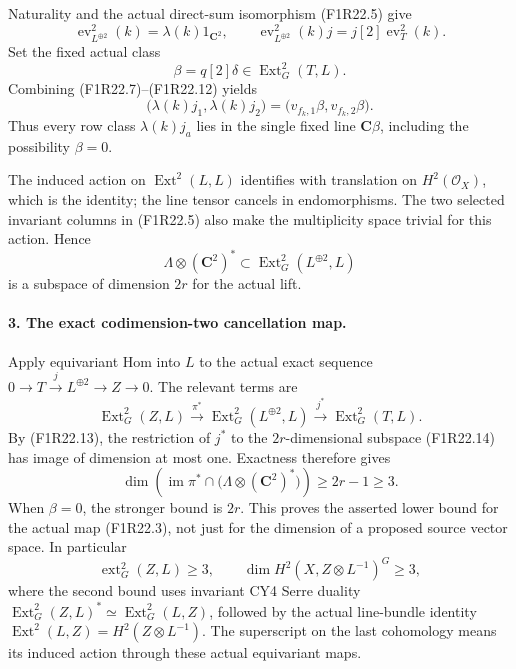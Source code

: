 Naturality and the actual direct-sum isomorphism
(F1R22.5) give
\[
 \operatorname{ev}_{L^{\oplus2}}^2(k)
             =\lambda(k)1_{\mathbf C^2},\qquad
 \operatorname{ev}_{L^{\oplus2}}^2(k)j
             =j[2]\operatorname{ev}_T^2(k).
 \tag{F1R22.11}
\]
Set the fixed actual class
\[
                          \beta=q[2]\delta
                              \in\operatorname{Ext}^2_G(T,L).
 \tag{F1R22.12}
\]
Combining (F1R22.7)--(F1R22.12) yields
\[
       \bigl(\lambda(k)j_1,\lambda(k)j_2\bigr)
                 =\bigl(v_{f_k,1}\beta,v_{f_k,2}\beta\bigr).
 \tag{F1R22.13}
\]
Thus every row class $\lambda(k)j_a$ lies in the
single fixed line $\mathbf C\beta$, including the
possibility $\beta=0$.

The induced action on $\operatorname{Ext}^2(L,L)$
identifies with translation on $H^2(\mathcal O_X)$,
which is the identity; the line tensor cancels in
endomorphisms. The two selected invariant columns
in (F1R22.5) also make the multiplicity space trivial
for this action. Hence
\[
 \Lambda\otimes(\mathbf C^2)^*
          \subset\operatorname{Ext}^2_G(L^{\oplus2},L)
 \tag{F1R22.14}
\]
is a subspace of dimension $2r$ for the actual lift.

\paragraph{3. The exact codimension-two cancellation map.}
Apply equivariant Hom into $L$ to the actual exact
sequence $0\to T\xrightarrow{j}L^{\oplus2}\to Z\to0$.
The relevant terms are
\[
 \operatorname{Ext}^2_G(Z,L)
       \xrightarrow{\pi^*}\operatorname{Ext}^2_G(L^{\oplus2},L)
       \xrightarrow{j^*}\operatorname{Ext}^2_G(T,L).
 \tag{F1R22.15}
\]
By (F1R22.13), the restriction of $j^*$ to the
$2r$-dimensional subspace (F1R22.14) has image of
dimension at most one. Exactness therefore gives
\[
 \dim\left(\operatorname{im}\pi^*
        \cap\bigl(\Lambda\otimes(\mathbf C^2)^*\bigr)\right)
                                    \ge2r-1\ge3.
 \tag{F1R22.16}
\]
When $\beta=0$, the stronger bound is $2r$.
This proves the asserted lower bound for the actual
map (F1R22.3), not just for the dimension of a proposed
source vector space. In particular
\[
 \operatorname{ext}^2_G(Z,L)\ge3,
       \qquad \dim H^2(X,Z\otimes L^{-1})^G\ge3,
 \tag{F1R22.17}
\]
where the second bound uses invariant
CY4 Serre duality
$\operatorname{Ext}^2_G(Z,L)^*\simeq
\operatorname{Ext}^2_G(L,Z)$, followed by the actual
line-bundle identity
$\operatorname{Ext}^2(L,Z)=H^2(Z\otimes L^{-1})$.
The superscript on the last cohomology means its
induced action through these actual equivariant maps.


